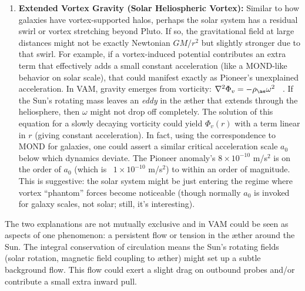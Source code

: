 \documentclass[a4paper, aps,preprint,superscriptaddress, 12pt]{revtex4}
\begin{document}
\begin{enumerate}
\item
\textbf{Extended Vortex Gravity (Solar Heliospheric Vortex):} Similar to how galaxies have vortex-supported halos, perhaps the solar system has a residual swirl or vortex stretching beyond Pluto. If so, the gravitational field at large distances might not be exactly Newtonian $GM/r^2$ but slightly stronger due to that swirl. For example, if a vortex-induced potential contributes an extra term that effectively adds a small constant acceleration (like a MOND-like behavior on solar scale), that could manifest exactly as Pioneer’s unexplained acceleration. In VAM, gravity emerges from vorticity: $\nabla^2 \Phi_v = -\rho_{\ae}\omega^2$~\cite{Iskandarani2025b} . If the Sun’s rotating mass leaves an \textit{eddy} in the æther that extends through the heliosphere, then $\omega$ might not drop off completely. The solution of this equation for a slowly decaying vorticity could yield $\Phi_v(r)$ with a term linear in $r$ (giving constant acceleration). In fact, using the correspondence to MOND for galaxies, one could assert a similar critical acceleration scale $a_0$ below which dynamics deviate. The Pioneer anomaly’s $8\times10^{-10}$ m/s$^2$ is on the order of $a_0$ (which is ~$1\times10^{-10}$ m/s$^2$) to within an order of magnitude. This is suggestive: the solar system might be just entering the regime where vortex “phantom” forces become noticeable (though normally $a_0$ is invoked for galaxy scales, not solar; still, it’s interesting).




\end{enumerate}

The two explanations are not mutually exclusive and in VAM could be seen as aspects of one phenomenon: a persistent flow or tension in the æther around the Sun. The integral conservation of circulation means the Sun’s rotating fields (solar rotation, magnetic field coupling to æther) might set up a subtle background flow. This flow could exert a slight drag on outbound probes and/or contribute a small extra inward pull.
\end{document}
